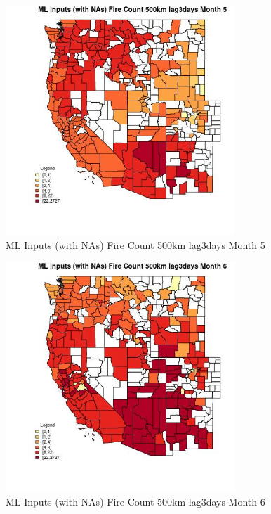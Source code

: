\begin{figure} 
\centering  
\includegraphics[width=0.77\textwidth]{Code_Outputs/Report_ML_input_PM25_Step4_part_f_de_duplicated_aveswNAs_CountyFire_Count_500km_lag3daysmedianMonth5.jpg} 
\caption{\label{fig:Report_ML_input_PM25_Step4_part_f_de_duplicated_aveswNAsCountyFire_Count_500km_lag3daysmedianMonth5}ML Inputs (with NAs) Fire Count 500km lag3days Month 5} 
\end{figure} 
 

\begin{figure} 
\centering  
\includegraphics[width=0.77\textwidth]{Code_Outputs/Report_ML_input_PM25_Step4_part_f_de_duplicated_aveswNAs_CountyFire_Count_500km_lag3daysmedianMonth6.jpg} 
\caption{\label{fig:Report_ML_input_PM25_Step4_part_f_de_duplicated_aveswNAsCountyFire_Count_500km_lag3daysmedianMonth6}ML Inputs (with NAs) Fire Count 500km lag3days Month 6} 
\end{figure} 
 

